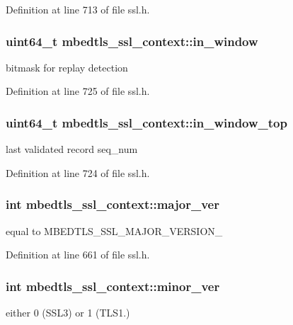 Definition at line 713 of file ssl.\-h.

\hypertarget{structmbedtls__ssl__context_a0728b2d8fb513ca83853eb1a24bbdf38}{
\subsubsection[{in\-\_\-window}]{\setlength{\rightskip}{0pt plus 5cm}uint64\-\_\-t mbedtls\-\_\-ssl\-\_\-context\-::in\-\_\-window}}\label{structmbedtls__ssl__context_a0728b2d8fb513ca83853eb1a24bbdf38}
bitmask for replay detection 

Definition at line 725 of file ssl.\-h.

\hypertarget{structmbedtls__ssl__context_a988404cded6bf548fa92b5800d20eb09}{
\subsubsection[{in\-\_\-window\-\_\-top}]{\setlength{\rightskip}{0pt plus 5cm}uint64\-\_\-t mbedtls\-\_\-ssl\-\_\-context\-::in\-\_\-window\-\_\-top}}\label{structmbedtls__ssl__context_a988404cded6bf548fa92b5800d20eb09}
last validated record seq\-\_\-num 

Definition at line 724 of file ssl.\-h.

\hypertarget{structmbedtls__ssl__context_a149cbf2760485998884d10b530e4580a}{
\subsubsection[{major\-\_\-ver}]{\setlength{\rightskip}{0pt plus 5cm}int mbedtls\-\_\-ssl\-\_\-context\-::major\-\_\-ver}}\label{structmbedtls__ssl__context_a149cbf2760485998884d10b530e4580a}
equal to M\-B\-E\-D\-T\-L\-S\-\_\-\-S\-S\-L\-\_\-\-M\-A\-J\-O\-R\-\_\-\-V\-E\-R\-S\-I\-O\-N\-\_ 

Definition at line 661 of file ssl.\-h.

\hypertarget{structmbedtls__ssl__context_ac68723758d3617fee8ac862931f495b2}{
\subsubsection[{minor\-\_\-ver}]{\setlength{\rightskip}{0pt plus 5cm}int mbedtls\-\_\-ssl\-\_\-context\-::minor\-\_\-ver}}\label{structmbedtls__ssl__context_ac68723758d3617fee8ac862931f495b2}
either 0 (S\-S\-L3) or 1 (T\-L\-S1.) 


